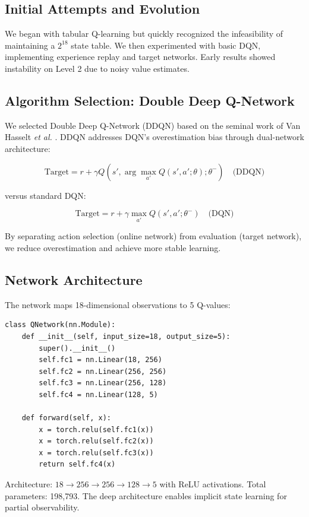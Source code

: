 \documentclass[12pt,a4paper]{article}
\begin{document}
\subsection{Initial Attempts and Evolution}

We began with tabular Q-learning but quickly recognized the infeasibility of maintaining a $2^{18}$ state table. We then experimented with basic DQN, implementing experience replay and target networks. Early results showed instability on Level 2 due to noisy value estimates.

\subsection{Algorithm Selection: Double Deep Q-Network}

We selected Double Deep Q-Network (DDQN) based on the seminal work of Van Hasselt \textit{et al.} \cite{van2015deep}. DDQN addresses DQN's overestimation bias through dual-network architecture:

$$\text{Target} = r + \gamma Q(s', \arg\max_{a'} Q(s', a'; \theta); \theta^-) \quad \text{(DDQN)}$$

versus standard DQN:

$$\text{Target} = r + \gamma \max_{a'} Q(s', a'; \theta^-) \quad \text{(DQN)}$$

By separating action selection (online network) from evaluation (target network), we reduce overestimation and achieve more stable learning.

\subsection{Network Architecture}

The network maps 18-dimensional observations to 5 Q-values:

\begin{lstlisting}[caption=Network Architecture Definition]
class QNetwork(nn.Module):
    def __init__(self, input_size=18, output_size=5):
        super().__init__()
        self.fc1 = nn.Linear(18, 256)
        self.fc2 = nn.Linear(256, 256)
        self.fc3 = nn.Linear(256, 128)
        self.fc4 = nn.Linear(128, 5)
    
    def forward(self, x):
        x = torch.relu(self.fc1(x))
        x = torch.relu(self.fc2(x))
        x = torch.relu(self.fc3(x))
        return self.fc4(x)
\end{lstlisting}

Architecture: $18 \to 256 \to 256 \to 128 \to 5$ with ReLU activations. Total parameters: 198,793. The deep architecture enables implicit state learning for partial observability.
\end{document}
